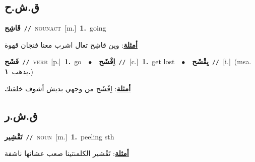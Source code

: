 \documentclass[10pt,a4paper,twoside]{article} %
\begin{document}
\begin{multicols}{2}
\vspace{-3mm}
\subsection*{\color{blue}\foreignlanguage{arabic}{ق.ش.ح}\color{blue}{}} 

{\setlength\topsep{0pt}\textbf{\foreignlanguage{arabic}{قَاشِح}}\ {\color{gray}\texttt{//}\color{black}}\ \textsc{noun\textunderscore act}\ [m.]\ \textbf{1.}~going\  \begin{flushright}\color{gray}\foreignlanguage{arabic}{\textbf{\underline{\foreignlanguage{arabic}{أمثلة}}}: وين قاشِح تعال اشرب معنا فنجان قهوة}\end{flushright}\color{black}} \vspace{2mm}

{\setlength\topsep{0pt}\textbf{\foreignlanguage{arabic}{قَشَح}}\ {\color{gray}\texttt{//}\color{black}}\ \textsc{verb}\ [p.]\ \textbf{1.}~go\ \ $\bullet$\ \ \setlength\topsep{0pt}\textbf{\foreignlanguage{arabic}{اِقْشَح}}\ {\color{gray}\texttt{//}\color{black}}\ [c.]\ \textbf{1.}~get lost\ \ $\bullet$\ \ \setlength\topsep{0pt}\textbf{\foreignlanguage{arabic}{يِقْشَح}}\ {\color{gray}\texttt{//}\color{black}}\ [i.]\ \color{gray}(msa. \foreignlanguage{arabic}{يذهب}~\foreignlanguage{arabic}{\textbf{١.}})\color{black}\  \begin{flushright}\color{gray}\foreignlanguage{arabic}{\textbf{\underline{\foreignlanguage{arabic}{أمثلة}}}: اِقْشَح من وجهي بديش أشوف خلقتك}\end{flushright}\color{black}} \vspace{2mm}

\vspace{-3mm}
\subsection*{\color{blue}\foreignlanguage{arabic}{ق.ش.ر}\color{blue}{}} 

{\setlength\topsep{0pt}\textbf{\foreignlanguage{arabic}{تَقْشِير}}\ {\color{gray}\texttt{//}\color{black}}\ \textsc{noun}\ [m.]\ \textbf{1.}~peeling sth\  \begin{flushright}\color{gray}\foreignlanguage{arabic}{\textbf{\underline{\foreignlanguage{arabic}{أمثلة}}}: تَقْشير الكلمنتينا صعب عشانها ناشفة}\end{flushright}\color{black}} \vspace{2mm}


\end{multicols}
\end{document}
